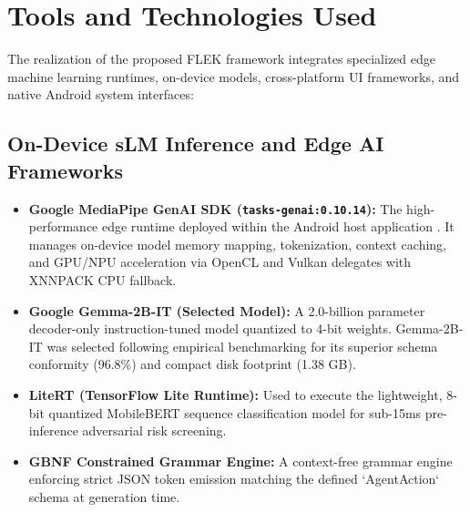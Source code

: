 \section{Tools and Technologies Used}

The realization of the proposed FLEK framework integrates specialized edge machine learning runtimes, on-device models, cross-platform UI frameworks, and native Android system interfaces:

\subsection{On-Device sLM Inference and Edge AI Frameworks}
\begin{itemize}
    \item \textbf{Google MediaPipe GenAI SDK (\texttt{tasks-genai:0.10.14}):} The high-performance edge runtime deployed within the Android host application \cite{mediapipe2024llm}. It manages on-device model memory mapping, tokenization, context caching, and GPU/NPU acceleration via OpenCL and Vulkan delegates with XNNPACK CPU fallback.
    \item \textbf{Google Gemma-2B-IT (Selected Model):} A 2.0-billion parameter decoder-only instruction-tuned model quantized to 4-bit weights. Gemma-2B-IT was selected following empirical benchmarking for its superior schema conformity (96.8\%) and compact disk footprint (1.38 GB).
    \item \textbf{LiteRT (TensorFlow Lite Runtime):} Used to execute the lightweight, 8-bit quantized MobileBERT sequence classification model for sub-15ms pre-inference adversarial risk screening.
    \item \textbf{GBNF Constrained Grammar Engine:} A context-free grammar engine enforcing strict JSON token emission matching the defined `AgentAction` schema at generation time.
\end{itemize}

